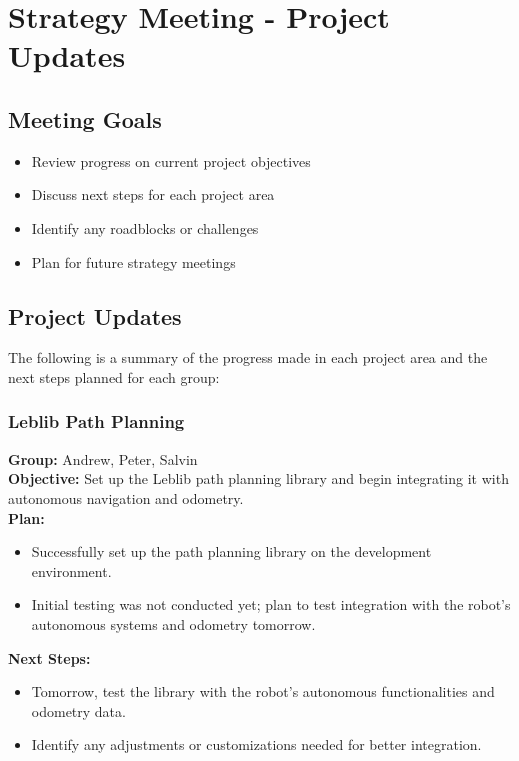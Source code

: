 \section{Strategy Meeting - Project Updates}

\subsection{Meeting Goals}
\begin{itemize}
    \item Review progress on current project objectives
    \item Discuss next steps for each project area
    \item Identify any roadblocks or challenges
    \item Plan for future strategy meetings
\end{itemize}

\subsection{Project Updates}
The following is a summary of the progress made in each project area and the next steps planned for each group:

\subsubsection{Leblib Path Planning}
\textbf{Group:} Andrew, Peter, Salvin\\
\textbf{Objective:} Set up the Leblib path planning library and begin integrating it with autonomous navigation and odometry.\\
\textbf{Plan:}
\begin{itemize}
    \item Successfully set up the path planning library on the development environment.
    \item Initial testing was not conducted yet; plan to test integration with the robot's autonomous systems and odometry tomorrow.
\end{itemize}
\textbf{Next Steps:}
\begin{itemize}
    \item Tomorrow, test the library with the robot's autonomous functionalities and odometry data.
    \item Identify any adjustments or customizations needed for better integration.
\end{itemize}

